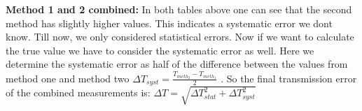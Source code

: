
\textbf{Method 1 and 2 combined:} In both tables above one can see that the second method has slightly higher values.
This indicates a systematic error we dont know.
Till now, we only considered statistical errors.
Now if we want to calculate the true value we have to consider the systematic error as well.
Here we determine the systematic error as half of the difference between the values from method one and
method two $\Delta T_{syst} = \frac{T_{meth_2} - T_{meth_1}}{2}$  .
So the final transmission error of the combined measurements is:
$\Delta T = \sqrt{\Delta T_{stat}^2 + \Delta T_{syst}^2}$  

